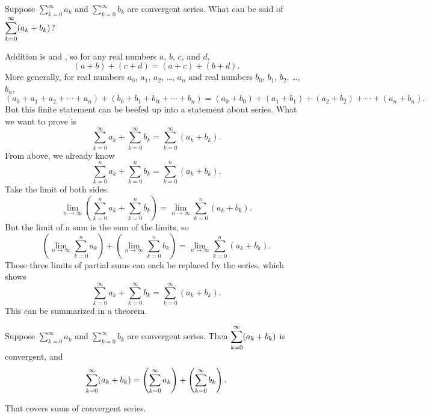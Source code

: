 Suppose $\sum_{k=0}^\infty a_k$ and $\sum_{k=0}^\infty b_k$ are
convergent series. What can be said of $\displaystyle\sum_{k=0}^\infty
(a_k+b_k)$?

Addition is  and , so for any real numbers $a$, $b$,
$c$, and $d$,
$$
(a+b)+(c+d) = (a+c) + (b+d).
$$
More generally, for real numbers $a_0$, $a_1$, $a_2$, \ldots, $a_n$ and real numbers
$b_0$, $b_1$, $b_2$, \ldots, $b_n$,
$$
(a_0 + a_1 + a_2 + \cdots + a_n)+(b_0 + b_1 + b_@ + \cdots + b_n) = (a_0 + b_0) + (a_1 + b_1) + (a_2 + b_2) + \cdots + (a_n + b_n).
$$
But this finite statement can be beefed up into a statement about series.  What we want to prove is
$$
\sum_{k=0}^\infty a_k + \sum_{k=0}^\infty b_k = \sum_{k=0}^\infty \left( a_k + b_k \right).
$$
From above, we already know
$$
\sum_{k=0}^n a_k + \sum_{k=0}^n b_k = \sum_{k=0}^n \left( a_k + b_k \right).
$$
Take the limit of both sides.
$$
\lim_{n \to \infty} \left( \sum_{k=0}^n a_k + \sum_{k=0}^n b_k \right) = \lim_{n \to \infty} \sum_{k=0}^n \left( a_k + b_k \right).
$$
But the limit of a sum is the sum of the limits, so
$$
\left( \lim_{n \to \infty} \sum_{k=0}^n a_k \right) + \left( \lim_{n \to \infty} \sum_{k=0}^n b_k \right) = \lim_{n \to \infty} \sum_{k=0}^n \left( a_k + b_k \right).
$$
Those three limits of partial sums can each be replaced by the series, which shows
$$
\sum_{k=0}^\infty a_k + \sum_{k=0}^\infty b_k = \sum_{k=0}^\infty \left( a_k + b_k \right).
$$
This can be summarized in a theorem.
\begin{theorem} \relax\label{thm:series-are-linear}
  Suppose $\sum_{k=0}^\infty a_k$ and $\sum_{k=0}^\infty b_k$ are
  convergent series. Then $\displaystyle\sum_{k=0}^\infty (a_k+b_k)$ is
  convergent, and
$$\displaystyle\sum_{k=0}^\infty (a_k+b_k)=\left( \sum_{k=0}^\infty a_k \right)+\left(\sum_{k=0}^\infty b_k\right).$$
\end{theorem}
That covers sums of convergent series.

